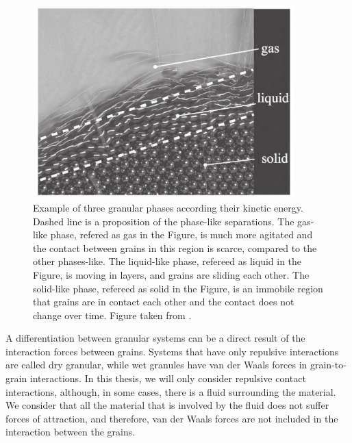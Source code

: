 \begin{figure}[H]
    \centering
    \includegraphics[width=0.9\textwidth]{04-figuras/Exemplo_Fases.png}
    \caption[Granular phases.]{Example of three granular phases according their kinetic energy. Dashed line is a proposition of the phase-like separations. The gas-like phase, refered as gas in the Figure, is much more agitated and the contact between grains in this region is scarce, compared to the other phases-like. The liquid-like phase, refereed as liquid in the Figure, is moving in layers, and grains are sliding each other. The solid-like phase, refereed as solid in the Figure, is an immobile region that grains are in contact each other and the contact does not change over time. Figure taken from \cite{Granular_Media_Between_Fluid_and_Solid}.}
    \label{fig:exemplo_fases}
\end{figure}

    A differentiation between granular systems can be a direct result of the interaction forces between grains. Systems that have only repulsive interactions are called dry granular, while wet granules have van der Waals forces in grain-to-grain interactions. In this thesis, we will only consider repulsive contact interactions, although, in some cases, there is a fluid surrounding the material. We consider that all the material that is involved by the fluid does not suffer forces of attraction, and therefore, van der Waals forces are not included in the interaction between the grains.

